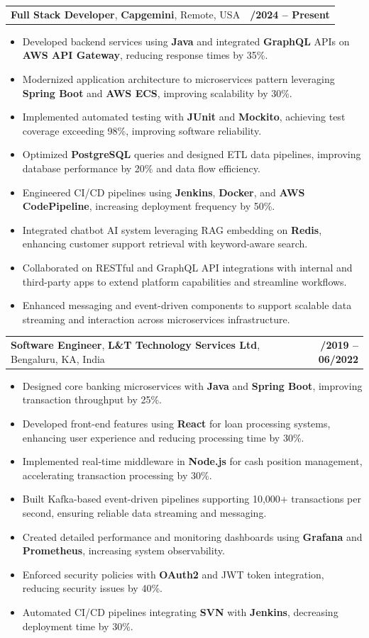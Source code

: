 \documentclass[letterpaper,11pt]{article}
\makeatletter
\newcommand{\resumeItem}[1]{
  \item\footnotesize{
    {#1 \vspace{-2pt}}
  }
}
\newcommand{\resumeSubheading}[4]{
  \vspace{-2pt}\item
    \begin{tabular*}{1.0\textwidth}[t]{l@{\extracolsep{\fill}}r}
      \textbf{\fontsize{10pt}{14pt}\selectfont #3}, \textbf{\fontsize{10pt}{14pt}\selectfont #1}, \fontsize{10pt}{14pt}\selectfont #4 & \textbf{\fontsize{10pt}{14pt}\selectfont #2} \\
    \end{tabular*}\vspace{-7pt}
}
\newcommand{\resumeItemListStart}{\begin{itemize}[leftmargin=*]}
\newcommand{\resumeItemListEnd}{\end{itemize}\vspace{-5pt}}
\makeatother
\begin{document}
    \resumeSubheading
        {Capgemini}{01/2024 -- Present}
        {Full Stack Developer}{Remote, USA}
      \resumeItemListStart
        \resumeItem{Developed backend services using \textbf{Java} and integrated \textbf{GraphQL} APIs on \textbf{AWS API Gateway}, reducing response times by 35\%.}
        \resumeItem{Modernized application architecture to microservices pattern leveraging \textbf{Spring Boot} and \textbf{AWS ECS}, improving scalability by 30\%.}
        \resumeItem{Implemented automated testing with \textbf{JUnit} and \textbf{Mockito}, achieving test coverage exceeding 98\%, improving software reliability.}
        \resumeItem{Optimized \textbf{PostgreSQL} queries and designed ETL data pipelines, improving database performance by 20\% and data flow efficiency.}
        \resumeItem{Engineered CI/CD pipelines using \textbf{Jenkins}, \textbf{Docker}, and \textbf{AWS CodePipeline}, increasing deployment frequency by 50\%.}
        \resumeItem{Integrated chatbot AI system leveraging RAG embedding on \textbf{Redis}, enhancing customer support retrieval with keyword-aware search.}
        \resumeItem{Collaborated on RESTful and GraphQL API integrations with internal and third-party apps to extend platform capabilities and streamline workflows.}
        \resumeItem{Enhanced messaging and event-driven components to support scalable data streaming and interaction across microservices infrastructure.}
      \resumeItemListEnd

    \resumeSubheading
        {L\&T Technology Services Ltd}{08/2019 -- 06/2022}
        {Software Engineer}{Bengaluru, KA, India}
      \resumeItemListStart
        \resumeItem{Designed core banking microservices with \textbf{Java} and \textbf{Spring Boot}, improving transaction throughput by 25\%.}
        \resumeItem{Developed front-end features using \textbf{React} for loan processing systems, enhancing user experience and reducing processing time by 30\%.}
        \resumeItem{Implemented real-time middleware in \textbf{Node.js} for cash position management, accelerating transaction processing by 30\%.}
        \resumeItem{Built Kafka-based event-driven pipelines supporting 10,000+ transactions per second, ensuring reliable data streaming and messaging.}
        \resumeItem{Created detailed performance and monitoring dashboards using \textbf{Grafana} and \textbf{Prometheus}, increasing system observability.}
        \resumeItem{Enforced security policies with \textbf{OAuth2} and JWT token integration, reducing security issues by 40\%.}
        \resumeItem{Automated CI/CD pipelines integrating \textbf{SVN} with \textbf{Jenkins}, decreasing deployment time by 30\%.}
      \resumeItemListEnd
\end{document}
